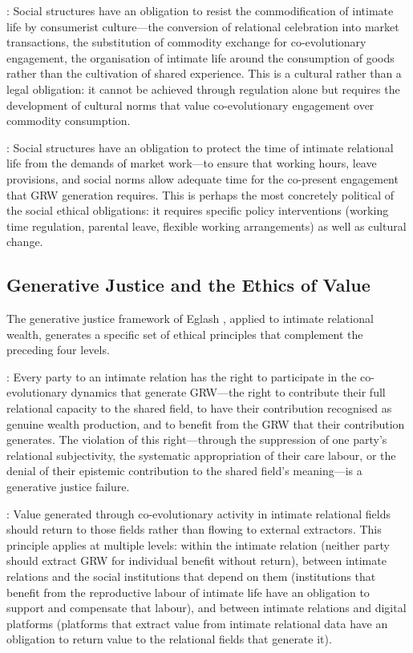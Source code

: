 : Social structures have an obligation to resist the commodification of intimate life by consumerist culture---the conversion of relational celebration into market transactions, the substitution of commodity exchange for co-evolutionary engagement, the organisation of intimate life around the consumption of goods rather than the cultivation of shared experience. This is a cultural rather than a legal obligation: it cannot be achieved through regulation alone but requires the development of cultural norms that value co-evolutionary engagement over commodity consumption.

: Social structures have an obligation to protect the time of intimate relational life from the demands of market work---to ensure that working hours, leave provisions, and social norms allow adequate time for the co-present engagement that GRW generation requires. This is perhaps the most concretely political of the social ethical obligations: it requires specific policy interventions (working time regulation, parental leave, flexible working arrangements) as well as cultural change.

\subsection{Generative Justice and the Ethics of Value}
\label{p15:subsec:generative_justice_ethics}

\noindent
The generative justice framework of Eglash \parencite{eglash2016}, applied to intimate relational wealth, generates a specific set of ethical principles that complement the preceding four levels.

: Every party to an intimate relation has the right to participate in the co-evolutionary dynamics that generate GRW---the right to contribute their full relational capacity to the shared field, to have their contribution recognised as genuine wealth production, and to benefit from the GRW that their contribution generates. The violation of this right---through the suppression of one party's relational subjectivity, the systematic appropriation of their care labour, or the denial of their epistemic contribution to the shared field's meaning---is a generative justice failure.

: Value generated through co-evolutionary activity in intimate relational fields should return to those fields rather than flowing to external extractors. This principle applies at multiple levels: within the intimate relation (neither party should extract GRW for individual benefit without return), between intimate relations and the social institutions that depend on them (institutions that benefit from the reproductive labour of intimate life have an obligation to support and compensate that labour), and between intimate relations and digital platforms (platforms that extract value from intimate relational data have an obligation to return value to the relational fields that generate it).

